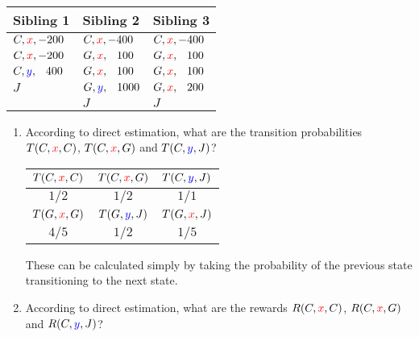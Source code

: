 \documentclass[12pt]{article}
\begin{document}
\begin{enumerate}
\begin{center}
\begin{tabular}{|l|l|l|} \hline
{\bf Sibling 1} & {\bf Sibling 2} & {\bf Sibling 3} \\ \hline
$C, {\color{red}{x}}, -200$ & $C, {\color{red}{x}}, -400$ & $C, {\color{red}{x}}, -400$ \\
$C, {\color{red}{x}}, -200$ & $G, {\color{red}{x}},  \phantom{-}100$ & $G, {\color{red}{x}},  \phantom{-}100$ \\
$C, {\color{blue}{y}}, \phantom{-}400$ & $G, {\color{red}{x}},  \phantom{-}100$ & $G, {\color{red}{x}},  \phantom{-}100$ \\
$J$          & $G, {\color{blue}{y}}, \phantom{-}1000$ & $G, {\color{red}{x}},  \phantom{-}200$ \\
             & $J$          & $J$          \\ \hline
\end{tabular}
\end{center}

  \begin{enumerate}

  \item According to direct estimation, what are the transition
    probabilities $T(C,{\color{red}{x}},C)$, $T(C,{\color{red}{x}},G)$ and $T(C,{\color{blue}{y}},J)$?

    \begin{table}[H]
      \centering
      \begin{tabular}{c | c | c}
        \hline\hline
        $T(C,{\color{red}{x}},C)$ & $T(C,{\color{red}{x}},G)$ & $T(C,{\color{blue}{y}},J)$\\
        \hline
        $1/2$ & $1/2$ & $1/1$\\
        \hline
        $T(G, {\color{red}{x}}, G)$ & $T(G,{\color{blue}{y}},J)$ & $T(G,{\color{red}{x}},J)$\\
        \hline
        $4/5$ & $1/2$ & $1/5$\\
        \hline\hline
       \end{tabular}
      \end{table}

      These can be calculated simply by taking the probability of the previous state transitioning to the next state.

  \item According to direct estimation, what are the rewards
    $R(C,{\color{red}{x}},C)$, $R(C,{\color{red}{x}},G)$ and $R(C,{\color{blue}{y}},J)$?



\end{enumerate}
\end{enumerate}
\end{document}
